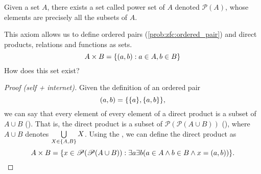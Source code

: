 \begin{axiom} \label{zfc:powers}
    Given a set $A$, there exists a set called power set of $A$ denoted $\mathscr{P}(A)$, whose elements are precisely all the subsets of $A$.   
\end{axiom}
\begin{rem}
    This axiom allows us to define ordered pairs (\cref{prob:zfc:ordered_pair}) and direct products, relations and functions as sets. \[
        A \times B = \set{(a, b) : a \in A, b \in B}
    \] \textcolor{exercise}{How does this set exist?}
\end{rem}
\begin{proof}[Proof \textcolor{self_proof}(self + internet)]
    Given the definition of an ordered pair \[
        (a, b) = \set{\set{a}, \set{a, b}},
    \] we can say that every element of every element of a direct product is a subset of $A \cup B$ ().
    That is, the direct product is a subset of $\mathscr{P}(\mathscr{P}(A \cup B))$ (), where $A \cup B$ denotes $\bigcup\limits_{X \in \set{A, B}} X$.
    Using the , we can define the direct product as \[
        A \times B = \set{x \in \mathscr{P}(\mathscr{P}(A \cup B)) : \exists a \exists b (a \in A \land b \in B \land x = (a, b))}. \qedhere
    \]
\end{proof}

